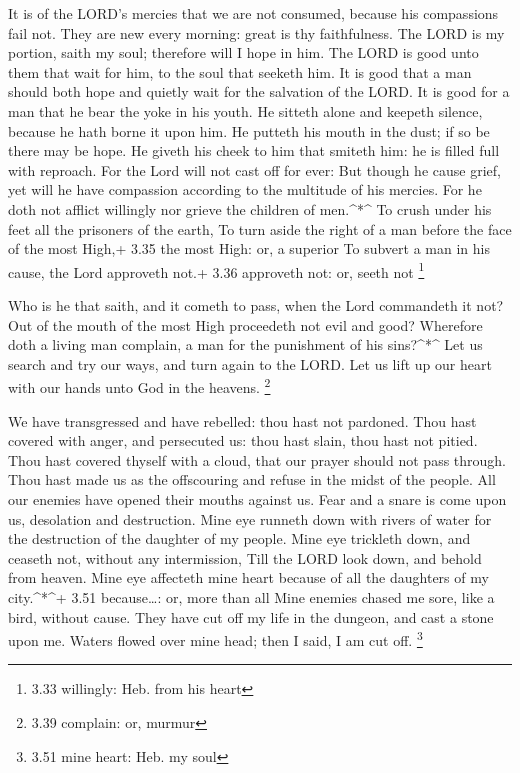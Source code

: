  It is of the LORD's mercies that we are not consumed,
because his compassions fail not.  They are new every
morning: great is thy faithfulness.  The LORD is my
portion, saith my soul; therefore will I hope in him.  The
LORD is good unto them that wait for him, to the soul that seeketh him.
 It is good that a man should both hope and quietly wait
for the salvation of the LORD.  It is good for a man that
he bear the yoke in his youth.  He sitteth alone and
keepeth silence, because he hath borne it upon him.  He
putteth his mouth in the dust; if so be there may be hope. 
He giveth his cheek to him that smiteth him: he is filled full with
reproach.  For the Lord will not cast off for ever:
 But though he cause grief, yet will he have compassion
according to the multitude of his mercies.  For he doth not
afflict willingly nor grieve the children of men.\^{}*\^{} 
To crush under his feet all the prisoners of the earth,  To
turn aside the right of a man before the face of the most High,+ 3.35
the most High: or, a superior  To subvert a man in his
cause, the Lord approveth not.+ 3.36 approveth not: or, seeth not
\footnote{3.33 willingly: Heb. from his heart}

 Who is he that saith, and it cometh to pass, when the Lord
commandeth it not?  Out of the mouth of the most High
proceedeth not evil and good?  Wherefore doth a living man
complain, a man for the punishment of his sins?\^{}*\^{} 
Let us search and try our ways, and turn again to the LORD.
 Let us lift up our heart with our hands unto God in the
heavens. \footnote{3.39 complain: or, murmur}

 We have transgressed and have rebelled: thou hast not
pardoned.  Thou hast covered with anger, and persecuted us:
thou hast slain, thou hast not pitied.  Thou hast covered
thyself with a cloud, that our prayer should not pass through.
 Thou hast made us as the offscouring and refuse in the
midst of the people.  All our enemies have opened their
mouths against us.  Fear and a snare is come upon us,
desolation and destruction.  Mine eye runneth down with
rivers of water for the destruction of the daughter of my people.
 Mine eye trickleth down, and ceaseth not, without any
intermission,  Till the LORD look down, and behold from
heaven.  Mine eye affecteth mine heart because of all the
daughters of my city.\^{}*\^{}+ 3.51 because\ldots: or, more than all
 Mine enemies chased me sore, like a bird, without cause.
 They have cut off my life in the dungeon, and cast a stone
upon me.  Waters flowed over mine head; then I said, I am
cut off. \footnote{3.51 mine heart: Heb. my soul}

